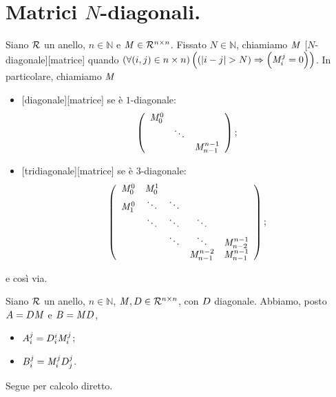 \section{Matrici $N$-diagonali.}
\label{Matrici_MatriciNDiagonali}
\begin{Definition}
	Siano $\mathcal{R}$ un anello, $n \in \mathbb{N}$ e $\mathit{M} \in \mathcal{R}^{n \times n}$. Fissato $N \in \mathbb{N}$, chiamiamo $\mathit{M}$ [$N$-diagonale][matrice] quando $\left ( \forall (i,j) \in n \times n \right ) \left ( \left ( \left \lvert i - j \right \rvert > N \right ) \Rightarrow \left ( \mathit{M}_i^j = 0 \right ) \right )$. In particolare, chiamiamo $\mathit{M}$
\begin{itemize}
	\item {}[diagonale][matrice] se \`e $1$-diagonale:
\[
\left (
\begin{array}{ccc}
\mathit{M}_0^0 & &\\
& \ddots &\\
& & \mathit{M}_{n - 1}^{n - 1}
\end{array}
\right );
\]
	\item {}[tridiagonale][matrice] se \`e $3$-diagonale:
\[
\left (
\begin{array}{ccccc}
\mathit{M}_0^0 & \mathit{M}_0^1 & & &\\
\mathit{M}_1^0 & \ddots & \ddots & &\\
& \ddots  & \ddots & \ddots &\\
& & \ddots & \ddots & \mathit{M}_{n - 2}^{n - 1}\\
& & & \mathit{M}_{n - 1}^{n - 2} & \mathit{M}_{n - 1}^{n - 1}
\end{array}
\right );
\]
\end{itemize}
e cos\`i via.
\end{Definition}
\begin{Theorem}
	Siano $\mathcal{R}$ un anello, $n \in \mathbb{N}$, $\mathit{M}, D \in \mathcal{R}^{n \times n}$, con $D$ diagonale. Abbiamo, posto $A = D\mathit{M}$ e $B = \mathit{M}D$,
	\begin{itemize}
		\item $A_i^j = D_i^i\mathit{M}_i^j$;
		\item $B_i^j = \mathit{M}_i^jD_j^j$.
	\end{itemize}
\end{Theorem}
\Proof Segue per calcolo diretto. \EndProof

